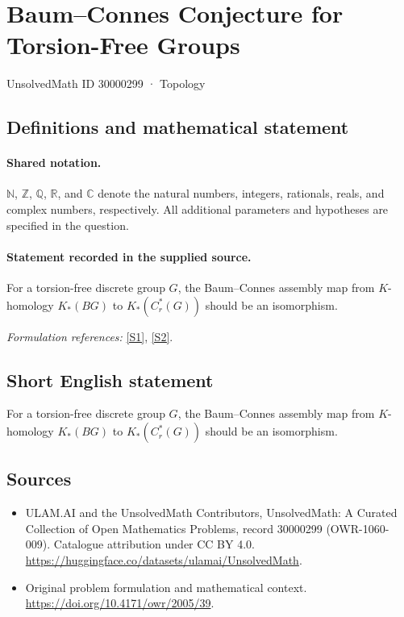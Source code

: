 \documentclass[11pt]{article}
\newcommand{\sref}[2]{\hyperlink{source:#1:#2}{[S#2]}}
\begin{document}
\setcounter{section}{30000298}
\section{Baum–Connes Conjecture for Torsion-Free Groups}\label{30000299}
{\small UnsolvedMath ID 30000299 · Topology}
\subsection{Definitions and mathematical statement}

\paragraph{Shared notation.}$\mathbb N$, $\mathbb Z$, $\mathbb Q$, $\mathbb R$, and $\mathbb C$ denote the natural numbers, integers, rationals, reals, and complex numbers, respectively. All additional parameters and hypotheses are specified in the question.


\paragraph{Statement recorded in the supplied source.}
For a torsion-free discrete group $G$, the Baum–Connes assembly map from $K$-homology $K_*(BG)$ to $K_*(C_r^*(G))$ should be an isomorphism.
\par\smallskip\textit{Formulation references:} \sref{30000299}{1}, \sref{30000299}{2}.
\subsection{Short English statement}
For a torsion-free discrete group $G$, the Baum–Connes assembly map from $K$-homology $K_*(BG)$ to $K_*(C_r^*(G))$ should be an isomorphism.
\subsection{Sources}
\begin{itemize}
\item[\hypertarget{source:30000299:1}{S1}] ULAM.AI and the UnsolvedMath Contributors, UnsolvedMath: A Curated Collection of Open Mathematics Problems, record 30000299 (OWR-1060-009). Catalogue attribution under CC BY 4.0.
\url{https://huggingface.co/datasets/ulamai/UnsolvedMath}.
\item[\hypertarget{source:30000299:2}{S2}] Original problem formulation and mathematical context.
\url{https://doi.org/10.4171/owr/2005/39}.
\end{itemize}
\label{end:30000299}
\end{document}
